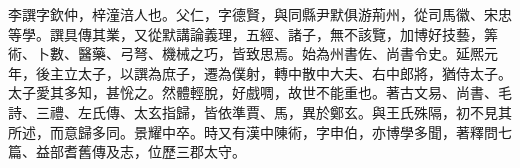
\begin{pinyinscope}
李譔字欽仲，梓潼涪人也。父仁，字德賢，與同縣尹默俱游荊州，從司馬徽、宋忠等學。譔具傳其業，又從默講論義理，五經、諸子，無不該覽，加博好技藝，筭術、卜數、醫藥、弓弩、機械之巧，皆致思焉。始為州書佐、尚書令史。延熈元年，後主立太子，以譔為庶子，遷為僕射，轉中散中大夫、右中郎將，猶侍太子。太子愛其多知，甚恱之。然體輕脫，好戲啁，故世不能重也。著古文易、尚書、毛詩、三禮、左氏傳、太玄指歸，皆依準賈、馬，異於鄭玄。與王氏殊隔，初不見其所述，而意歸多同。景耀中卒。時又有漢中陳術，字申伯，亦博學多聞，著釋問七篇、益部耆舊傳及志，位歷三郡太守。


\end{pinyinscope}